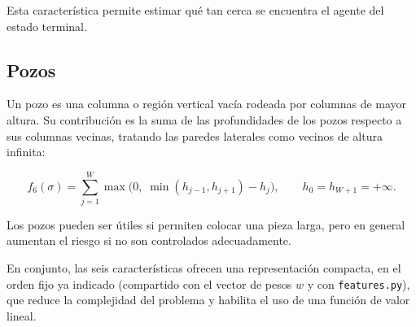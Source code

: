 Esta característica permite estimar qué tan cerca se encuentra el agente del estado terminal.

\subsection{Pozos}

Un pozo es una columna o región vertical vacía rodeada por columnas de mayor altura. Su contribución es la suma de las profundidades de los pozos respecto a sus columnas vecinas, tratando las paredes laterales como vecinos de altura infinita:

\begin{equation}
    f_6(\sigma) =
    \sum_{j=1}^{W}
    \max\!\bigl(0,\; \min(h_{j-1}, h_{j+1}) - h_j \bigr),
    \qquad h_0 = h_{W+1} = +\infty.
\end{equation}

Los pozos pueden ser útiles si permiten colocar una pieza larga, pero en general aumentan el riesgo si no son controlados adecuadamente.

\medskip

En conjunto, las seis características ofrecen una representación compacta, en el orden fijo ya indicado (compartido con el vector de pesos $w$ y con \texttt{features.py}), que reduce la complejidad del problema y habilita el uso de una función de valor lineal.
